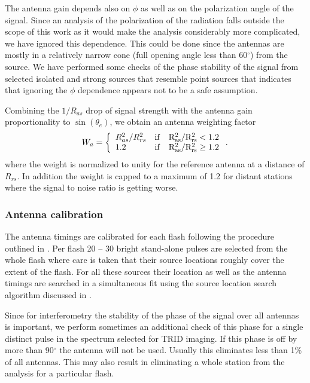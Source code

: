 The antenna gain depends also on $\phi$ as well as on the polarization angle of the signal. Since an analysis of the polarization of the radiation falls outside the scope of this work as it would make the analysis considerably more complicated, we have ignored this dependence. This could be done since the antennas are mostly in a relatively narrow cone (full opening angle less than 60$^\circ$) from the source.  We have performed some checks of the phase stability of the signal from selected isolated and strong  sources that resemble point sources that indicates that ignoring the $\phi$ dependence appears not to be a safe assumption.

Combining the $1/R_{as}$ drop of signal strength with the antenna gain proportionality to $\sin{(\theta_e)}$, we obtain an antenna weighting factor
\begin{equation}
W_a=\left\{
  \begin{array}{lr}
    R_{as}^2/R_{rs}^2 & \rm{if} \quad R_{as}^2/R_{rs}^2 < 1.2\\
    1.2 & \rm{if} \quad  R_{as}^2/R_{rs}^2 \ge 1.2
  \end{array} \;. \eqlab{W}
\right.
\end{equation}
where the weight is normalized to unity for the reference antenna at a distance of $R_{rs}$. In addition the weight is capped to a maximum of 1.2 for distant stations where the signal to noise ratio is getting worse.

\subsubsection{Antenna calibration}

The antenna timings are calibrated for each flash following the procedure outlined in \cite{Scholten:2021-init}. Per flash 20  -- 30 bright stand-alone pulses are selected from the whole flash where care is taken that their source locations roughly cover the extent of the flash. For all these sources their location as well as the antenna timings are searched in a simultaneous fit using the source location search algorithm discussed in \cite{Scholten:2021-init}.

Since for interferometry the stability of the phase of the signal over all antennas is important, we perform sometimes an additional check of this phase for a single distinct pulse in the spectrum selected for TRID imaging. If this phase is off by more than 90$^\circ$ the antenna will not be used. Usually this eliminates less than 1\% of all antennas. This may also result in eliminating a whole station from the analysis for a particular flash.

